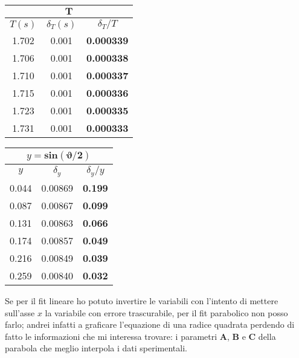 \documentclass{article}
\begin{document}
\begin{minipage}{0.5\textwidth}
	\begin{table}[H]
		\centering
		\begin{tabular}{@{}ccc@{}}
			\multicolumn{3}{c}{$\mathbf{T}$} \\ \midrule
			$T(s)$ & $\delta_T (s)$ & $\delta_T / T$ \\ \midrule
			1.702 & 0.001 & \textbf{0.000339} \\
			1.706 & 0.001 & \textbf{0.000338} \\
			1.710 & 0.001 & \textbf{0.000337} \\
			1.715 & 0.001 & \textbf{0.000336} \\
			1.723 & 0.001 & \textbf{0.000335} \\
			1.731 & 0.001 & \textbf{0.000333}  \\ \bottomrule   
		\end{tabular}
	\end{table}
\end{minipage}
\begin{minipage}{0.5\textwidth}
	\begin{table}[H]
		\centering
		\begin{tabular}{@{}ccc@{}}
			
			\multicolumn{3}{c}{$y = \mathbf{sin{\left(\vartheta/2\right)}}$} \\ \midrule
			$y$ & $\delta_y$ & $\delta_y / y$ \\ \midrule
			0.044 & 0.00869 & \textbf{0.199} \\
			0.087 & 0.00867 & \textbf{0.099} \\
			0.131 & 0.00863 & \textbf{0.066} \\
			0.174 & 0.00857 & \textbf{0.049} \\
			0.216 & 0.00849 & \textbf{0.039} \\
			0.259 & 0.00840 & \textbf{0.032}  \\ \bottomrule  
		\end{tabular}
	\end{table}
\end{minipage}
\vspace{1cm}


\noindent
Se per il fit lineare ho potuto invertire le variabili con l'intento di mettere sull'asse $x$ la variabile con errore trascurabile, per il fit parabolico non posso farlo; andrei infatti a graficare l'equazione di una radice quadrata perdendo di fatto le informazioni che mi interessa trovare: i parametri \textbf{A}, \textbf{B} e \textbf{C} della parabola che meglio interpola i dati sperimentali.
\end{document}
